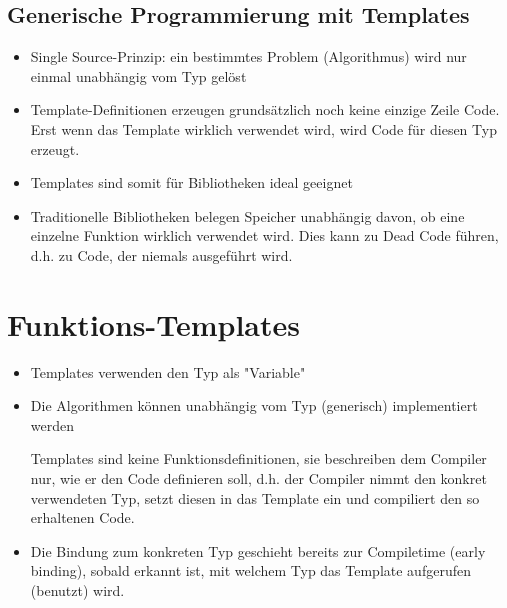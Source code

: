\subsection{Generische Programmierung mit Templates}
\begin{itemize}
	\item Single Source-Prinzip: ein bestimmtes Problem (Algorithmus) wird nur einmal unabhängig vom Typ gelöst
	\item Template-Definitionen erzeugen grundsätzlich noch keine einzige Zeile Code. Erst wenn das Template wirklich verwendet wird, wird Code für diesen Typ erzeugt.
	\item Templates sind somit für Bibliotheken ideal geeignet
	\item Traditionelle Bibliotheken belegen Speicher unabhängig davon, ob eine einzelne Funktion wirklich verwendet wird. Dies kann zu Dead Code führen, d.h. zu Code, der niemals ausgeführt wird.
\end{itemize}

\section{Funktions-Templates}
\begin{itemize}
	\item Templates verwenden den Typ als "Variable"
	\item Die Algorithmen können unabhängig vom Typ (generisch) implementiert werden
	\begin{achtung} Templates sind keine Funktionsdefinitionen, sie beschreiben dem Compiler nur, wie er den Code definieren soll, d.h. der Compiler nimmt den konkret verwendeten Typ, setzt diesen in das Template ein und compiliert den so erhaltenen Code.
	\end{achtung}
	\item Die Bindung zum konkreten Typ geschieht bereits zur Compiletime (early binding), sobald erkannt ist, mit welchem Typ das Template aufgerufen (benutzt) wird.
\end{itemize}

